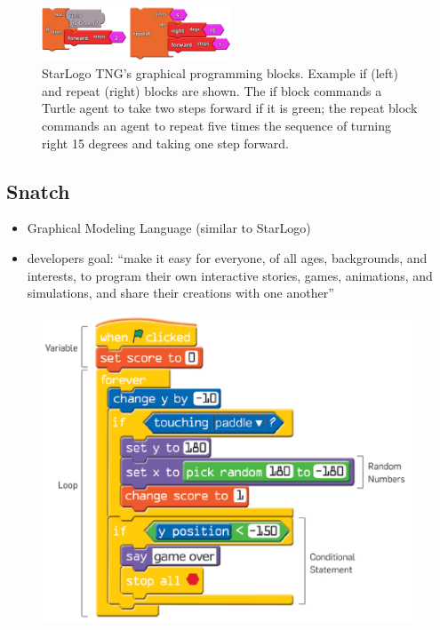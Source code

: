 \documentclass[runningheads,a4paper]{llncs}
\begin{document}
  \begin{figure}[ht]
	\centering
  \includegraphics[width=0.5\textwidth]{images/StarLogoTNGBlocksEx.PNG}
	\caption{ StarLogo TNG’s graphical programming blocks. Example if (left) and repeat (right) blocks are shown. The
	  if block commands a Turtle agent to take two steps forward if it is green; the repeat block commands an agent to
	  repeat five times the sequence of turning right 15 degrees and taking one step forward.}
	\label{fig1}
  \end{figure}
  
   \subsection{Snatch}

  \begin{itemize}
  \item Graphical Modeling Language (similar to StarLogo)
  \item developers goal: ``make it easy for everyone,
of all ages, backgrounds, and interests, to program
their own interactive stories, games, animations, and
simulations, and share their creations with one another''
  \end{itemize}
    \begin{figure}[ht]
      \centering
      \includegraphics[width=\textwidth]{images/Snatch1.PNG}
    \end{figure}
  
\end{document}

